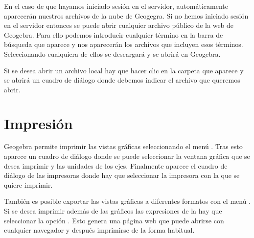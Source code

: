 En el caso de que hayamos iniciado sesión en el servidor, automáticamente aparecerán nuestros archivos de la nube de Geogegra.
Si no hemos iniciado sesión en el servidor entonces se puede abrir cualquier archivo público de la web de Geogebra.
Para ello podemos introducir cualquier término en la barra de búsqueda que aparece y nos aparecerán los archivos que incluyen esos términos.
Seleccionando cualquiera de ellos se descargará y se abrirá en Geogebra.

Si se desea abrir un archivo local hay que hacer clic en la carpeta que aparece y se abrirá un cuadro de diálogo donde debemos indicar el archivo que queremos abrir.


\section{Impresión}
Geogebra permite imprimir las vistas gráficas seleccionando el menú .
Tras esto aparece un cuadro de diálogo donde se puede seleccionar la ventana gráfica que se desea imprimir y las unidades de los ejes.
Finalmente aparece el cuadro de diálogo de las impresoras donde hay que seleccionar la impresora con la que se quiere imprimir.

También es posible exportar las vistas gráficas a diferentes formatos con el menú .
Si se desea imprimir además de las gráficos las expresiones de la  hay que seleccionar la opción .
Esto genera una página web que puede abrirse con cualquier navegador y después imprimirse de la forma habitual.


